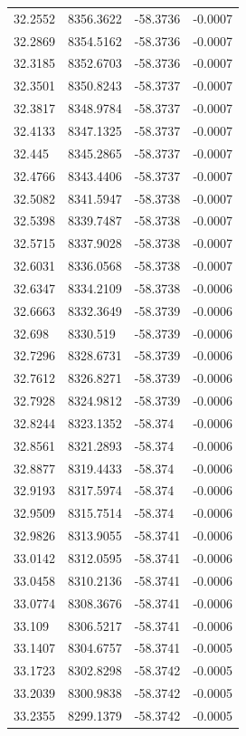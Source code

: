 \begin{table}[H]
\begin{tabular}{llll}
32.2552 & 8356.3622 & -58.3736 & -0.0007 \\
32.2869 & 8354.5162 & -58.3736 & -0.0007 \\
32.3185 & 8352.6703 & -58.3736 & -0.0007 \\
32.3501 & 8350.8243 & -58.3737 & -0.0007 \\
32.3817 & 8348.9784 & -58.3737 & -0.0007 \\
32.4133 & 8347.1325 & -58.3737 & -0.0007 \\
32.445 & 8345.2865 & -58.3737 & -0.0007 \\
32.4766 & 8343.4406 & -58.3737 & -0.0007 \\
32.5082 & 8341.5947 & -58.3738 & -0.0007 \\
32.5398 & 8339.7487 & -58.3738 & -0.0007 \\
32.5715 & 8337.9028 & -58.3738 & -0.0007 \\
32.6031 & 8336.0568 & -58.3738 & -0.0007 \\
32.6347 & 8334.2109 & -58.3738 & -0.0006 \\
32.6663 & 8332.3649 & -58.3739 & -0.0006 \\
32.698 & 8330.519 & -58.3739 & -0.0006 \\
32.7296 & 8328.6731 & -58.3739 & -0.0006 \\
32.7612 & 8326.8271 & -58.3739 & -0.0006 \\
32.7928 & 8324.9812 & -58.3739 & -0.0006 \\
32.8244 & 8323.1352 & -58.374 & -0.0006 \\
32.8561 & 8321.2893 & -58.374 & -0.0006 \\
32.8877 & 8319.4433 & -58.374 & -0.0006 \\
32.9193 & 8317.5974 & -58.374 & -0.0006 \\
32.9509 & 8315.7514 & -58.374 & -0.0006 \\
32.9826 & 8313.9055 & -58.3741 & -0.0006 \\
33.0142 & 8312.0595 & -58.3741 & -0.0006 \\
33.0458 & 8310.2136 & -58.3741 & -0.0006 \\
33.0774 & 8308.3676 & -58.3741 & -0.0006 \\
33.109 & 8306.5217 & -58.3741 & -0.0006 \\
33.1407 & 8304.6757 & -58.3741 & -0.0005 \\
33.1723 & 8302.8298 & -58.3742 & -0.0005 \\
33.2039 & 8300.9838 & -58.3742 & -0.0005 \\
33.2355 & 8299.1379 & -58.3742 & -0.0005 \\

\end{tabular}
\end{table}
